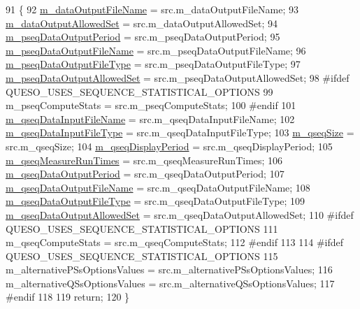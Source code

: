 \begin{DoxyCode}
91 \{
92   \hyperlink{class_q_u_e_s_o_1_1_mc_options_values_a67247424cb0b327fc1b4d6f067ce449c}{m\_dataOutputFileName}          = src.m\_dataOutputFileName;
93   \hyperlink{class_q_u_e_s_o_1_1_mc_options_values_acd7555643c1595e497ccc47bdfae8d55}{m\_dataOutputAllowedSet}        = src.m\_dataOutputAllowedSet;
94   \hyperlink{class_q_u_e_s_o_1_1_mc_options_values_a7e7f833d945cdfecac2000196fae1aa8}{m\_pseqDataOutputPeriod}        = src.m\_pseqDataOutputPeriod;
95   \hyperlink{class_q_u_e_s_o_1_1_mc_options_values_a8db3604c003959cb7ae7144a6bb37834}{m\_pseqDataOutputFileName}      = src.m\_pseqDataOutputFileName;
96   \hyperlink{class_q_u_e_s_o_1_1_mc_options_values_a7409d101fbe0676f87754234567dbc33}{m\_pseqDataOutputFileType}      = src.m\_pseqDataOutputFileType;
97   \hyperlink{class_q_u_e_s_o_1_1_mc_options_values_a264ab755cc81477580ef59ad7ffcd7e7}{m\_pseqDataOutputAllowedSet}    = src.m\_pseqDataOutputAllowedSet; 
98 \textcolor{preprocessor}{#ifdef QUESO\_USES\_SEQUENCE\_STATISTICAL\_OPTIONS}
99 \textcolor{preprocessor}{}  m\_pseqComputeStats            = src.m\_pseqComputeStats;
100 \textcolor{preprocessor}{#endif}
101 \textcolor{preprocessor}{}  \hyperlink{class_q_u_e_s_o_1_1_mc_options_values_aedf79873213bca688ebbf6d873f42e8e}{m\_qseqDataInputFileName}       = src.m\_qseqDataInputFileName;
102   \hyperlink{class_q_u_e_s_o_1_1_mc_options_values_ac44d90277d7ba36d096ca5254614440d}{m\_qseqDataInputFileType}       = src.m\_qseqDataInputFileType;
103   \hyperlink{class_q_u_e_s_o_1_1_mc_options_values_a54e8c4bb7d5ffa7755da7d148019c86e}{m\_qseqSize}                    = src.m\_qseqSize;
104   \hyperlink{class_q_u_e_s_o_1_1_mc_options_values_a4ab5a0e5c5d3d47fa15516d98739ae25}{m\_qseqDisplayPeriod}           = src.m\_qseqDisplayPeriod;
105   \hyperlink{class_q_u_e_s_o_1_1_mc_options_values_a4ae449bf66717fbb497b2cf42fb53923}{m\_qseqMeasureRunTimes}         = src.m\_qseqMeasureRunTimes;
106   \hyperlink{class_q_u_e_s_o_1_1_mc_options_values_a8680e9d1886eb0a5d0e5b856b2471dfa}{m\_qseqDataOutputPeriod}        = src.m\_qseqDataOutputPeriod;
107   \hyperlink{class_q_u_e_s_o_1_1_mc_options_values_a1c2a61e5c129ba0c4c2455b75709feee}{m\_qseqDataOutputFileName}      = src.m\_qseqDataOutputFileName;
108   \hyperlink{class_q_u_e_s_o_1_1_mc_options_values_a4816ea4c0aef22cc5d2e9057ea44b73e}{m\_qseqDataOutputFileType}      = src.m\_qseqDataOutputFileType;
109   \hyperlink{class_q_u_e_s_o_1_1_mc_options_values_a15671d02e2a6fa2052361dde6342e263}{m\_qseqDataOutputAllowedSet}    = src.m\_qseqDataOutputAllowedSet; 
110 \textcolor{preprocessor}{#ifdef QUESO\_USES\_SEQUENCE\_STATISTICAL\_OPTIONS}
111 \textcolor{preprocessor}{}  m\_qseqComputeStats            = src.m\_qseqComputeStats;
112 \textcolor{preprocessor}{#endif}
113 \textcolor{preprocessor}{}
114 \textcolor{preprocessor}{#ifdef QUESO\_USES\_SEQUENCE\_STATISTICAL\_OPTIONS}
115 \textcolor{preprocessor}{}  m\_alternativePSsOptionsValues = src.m\_alternativePSsOptionsValues;
116   m\_alternativeQSsOptionsValues = src.m\_alternativeQSsOptionsValues;
117 \textcolor{preprocessor}{#endif}
118 \textcolor{preprocessor}{}
119   \textcolor{keywordflow}{return};
120 \}
\end{DoxyCode}
